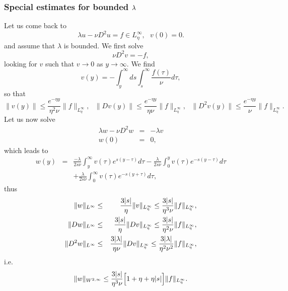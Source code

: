 \documentclass[11pt]{article}
\begin{document}
\subsubsection{Special estimates for bounded $\protect\lambda $}

Let us come back to 
\begin{equation}
\lambda u-\nu D^{2}u=f\in L_{\eta}^{\infty },\text{ }v(0)=0.
\label{equ small lambda}
\end{equation}%
and assume that $\lambda $ is bounded. We first solve%
\begin{equation*}
\nu D^{2}v=-f,
\end{equation*}%
looking for $v$ such that $v\rightarrow 0$ as $y\rightarrow \infty .$ We find%
\begin{equation*}
v(y)=-\int_{y}^{\infty }ds\int_{s}^{\infty }\frac{f(\tau )}{\nu }d\tau ,
\end{equation*}%
so that%
\begin{equation*}
\|v(y)\|\leq \frac{e^{-\eta y}}{\eta ^{2}\nu }\|f\|_{L_{\eta }^{\infty }},\text{ }%
\|Dv(y)\|\leq \frac{e^{-\eta y}}{\eta \nu }\|f\|_{L_{\eta }^{\infty }},\text{ }%
\|D^{2}v(y)\|\leq \frac{e^{-\eta y}}{\nu }\|f\|_{L_{\eta }^{\infty }}.
\end{equation*}%
Let us now solve%
\begin{eqnarray*}
\lambda w-\nu D^{2}w &=&-\lambda v \\
w(0) &=&0,
\end{eqnarray*}%
which leads to
\begin{eqnarray*}
w(y) &=&\frac{-\lambda }{2s\nu }\int_{y}^{\infty }v(\tau )e^{s(y-\tau
)}d\tau -\frac{\lambda }{2s\nu }\int_{0}^{y}v(\tau )e^{-s(y-\tau )}d\tau \\
&&+\frac{\lambda }{2s\nu }\int_{0}^{\infty }v(\tau )e^{-s(y+\tau )}d\tau ,
\end{eqnarray*}%
thus
\begin{eqnarray*}
\|w\|_{L^{\infty }} &\leq &\frac{3|s|}{\eta }\|v\|_{L_{\eta }^{\infty }}\leq \frac{%
3|s|}{\eta ^{3}\nu }\|f\|_{L_{\eta }^{\infty }}, \\
\|Dw\|_{L^{\infty }} &\leq &\frac{3|s|}{\eta }\|Dv\|_{L_{\eta }^{\infty }}\leq \frac{%
3|s|}{\eta ^{2}\nu }\|f\|_{L_{\eta }^{\infty }}, \\
\|D^{2}w\|_{L^{\infty }} &\leq &\frac{3|\lambda |}{\eta \nu }\|Dv\|_{L_{\eta }^{%
\infty }}\leq \frac{3|\lambda |}{\eta ^{2}\nu ^{2}}\|f\|_{L_{\eta }^{\infty }},
\end{eqnarray*}%
i.e. 
\begin{equation*}
\|w\|_{W^{2,\infty }}\leq \frac{3|s|}{\eta ^{3}\nu } \Bigl[ 1+\eta +\eta |s| \Bigr]\|f\|_{L_{\eta }^{%
\infty }}.
\end{equation*}%
\end{document}
